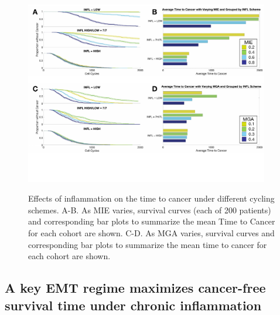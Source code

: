 \documentclass[11pt]{article}
\begin{document}
\begin{figure}
\center
{\includegraphics[width=0.95\textwidth]{Figure4/Figure4.pdf}}
\caption{Effects of inflammation on the time to cancer under different cycling schemes. A-B. As MIE varies, survival curves (each of 200 patients)  and corresponding bar plots to summarize the mean Time to Cancer for each cohort are shown. C-D. As MGA varies, survival curves  and corresponding bar plots to summarize the mean time to cancer for each cohort are shown.}
\label{fig:VaryINFL_and_MesPars}
\end{figure}



\subsection{A key EMT regime maximizes cancer-free survival time under chronic inflammation}\label{KeyEMT}
\end{document}

